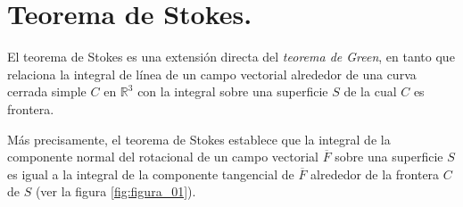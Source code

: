 \documentclass[hidelinks,12pt]{article}
\newtheorem{teo}{{\it Teorema}}[section]
\begin{document}
\section{Teorema de Stokes.}
El teorema de Stokes es una extensión directa del \emph{teorema de Green}, en tanto que relaciona la integral de línea de un campo vectorial alrededor de una curva cerrada simple $C$ en $\mathbb{R}^{3}$ con la integral sobre una superficie $S$ de la cual $C$ es frontera.
\par
Más precisamente, el teorema de Stokes establece que la integral de la componente normal del rotacional de un campo vectorial $\overline{F}$ sobre una superficie $S$ es igual a la integral de la componente tangencial de $\overline{F}$ alrededor de la frontera $C$ de $S$ (ver la figura \ref{fig:figura_01}).

\end{document}
